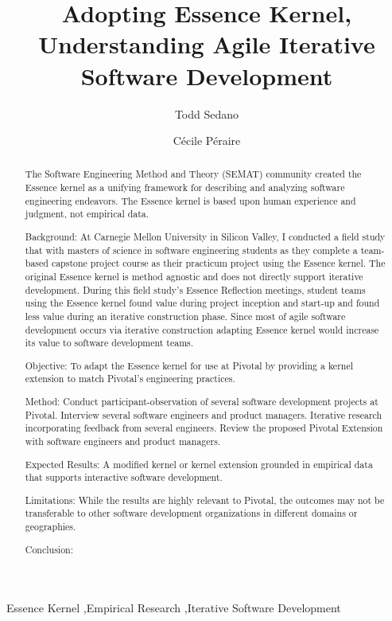 \documentclass[preprint,12pt,3p]{elsarticle}
\begin{document}
\begin{frontmatter}

\title{Adopting Essence Kernel, Understanding Agile Iterative Software Development}

\author{Todd Sedano}

\author{C\'ecile P\'eraire}

\address{Carnegie Mellon University}
\address{Silicon Valley Campus}
\address{Moffett Field, CA 94035, USA}


\begin{abstract}
The Software Engineering Method and Theory (SEMAT) community created the Essence kernel as a unifying framework for describing and analyzing software engineering endeavors. The Essence kernel is based upon human experience and judgment, not empirical data. 

Background: At Carnegie Mellon University in Silicon Valley, I conducted a field study that with masters of science in software engineering students as they complete a team-based capstone project course as their practicum project using the Essence kernel. The original Essence kernel is method agnostic and does not directly support iterative development. During this field study's Essence Reflection meetings, student teams using the Essence kernel found value during project inception and start-up and found less value during an iterative construction phase. Since most of agile software development occurs via iterative construction adapting Essence kernel would increase its value to software development teams.

Objective: To adapt the Essence kernel for use at Pivotal by providing a kernel extension to match Pivotal's engineering practices.

Method: Conduct participant-observation of several software development projects at Pivotal. Interview several software engineers and product managers. Iterative research incorporating feedback from several engineers. Review the proposed Pivotal Extension with software engineers and product managers. 

Expected Results: A modified kernel or kernel extension grounded in empirical data that supports interactive software development. 

Limitations: While the results are highly relevant to Pivotal, the outcomes may not be transferable to other software development organizations in different domains or geographies.

Conclusion: 

\end{abstract}

\begin{keyword}
Essence Kernel \sep Empirical Research \sep Iterative Software Development
\end{keyword}

\end{frontmatter}
\end{document}
